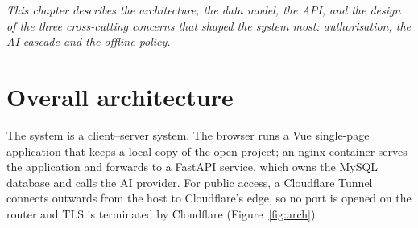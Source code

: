 \documentclass[../main.tex]{subfiles}
\begin{document}
\textit{This chapter describes the architecture, the data model, the API, and the design of the
three cross-cutting concerns that shaped the system most: authorisation, the AI cascade and the
offline policy.}

\section{Overall architecture}
The system is a client--server system. The browser runs a Vue single-page application that keeps a
local copy of the open project; an nginx container serves the application and forwards
 to a FastAPI service, which owns the MySQL database and calls the AI provider. For
public access, a Cloudflare Tunnel connects outwards from the host to Cloudflare's edge, so no port
is opened on the router and TLS is terminated by Cloudflare (Figure~\ref{fig:arch}).
\end{document}
